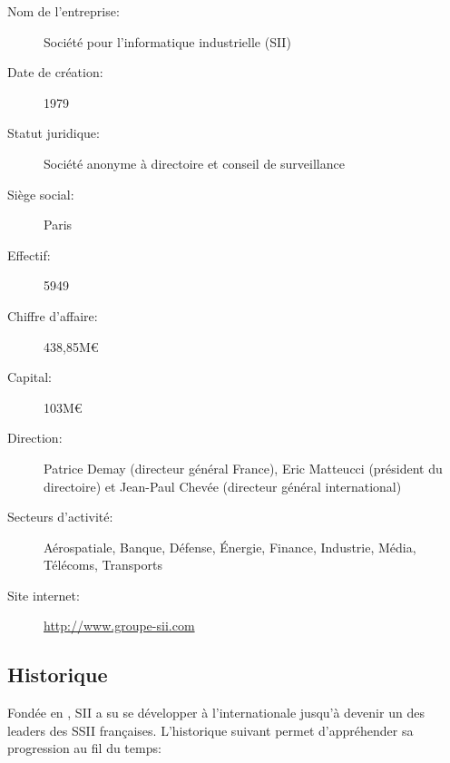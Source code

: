{{{{				\begin{description}
					\item[Nom de l'entreprise:] Société pour l'informatique industrielle (SII)
					\item[Date de création:] 1979\cite{sii_rf}
					\item[Statut juridique:] Société anonyme à directoire et conseil de surveillance
					\item[Siège social:] Paris
					\item[Effectif:] 5949\cite{sii_rs_2017}
					\item[Chiffre d'affaire:] 438,85M\euro\cite{sii_rs_2017}
					\item[Capital:] 103M\euro\cite{sii_rf}
					\item[Direction:] Patrice Demay (directeur général France), Eric Matteucci (président du directoire) et Jean-Paul Chevée (directeur général international)
					\item[Secteurs d'activité:] Aérospatiale, Banque, Défense, Énergie, Finance, Industrie, Média, Télécoms, Transports
					\item[Site internet:] \url{http://www.groupe-sii.com}
				\end{description}
			}
			
		}
		\subsection{Historique}
			
			\par
			{
				Fondée en , SII a su se développer à l'internationale jusqu'à devenir un des leaders des SSII françaises. L'historique suivant permet d'appréhender sa progression au fil du temps:
			}
			
}}
